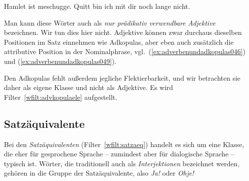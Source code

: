 \begin{exe}
  \ex\label{ex:adverbenundadkopulas045}
  \begin{xlist}
    \ex Hamlet ist meschugge.
    \ex Quitt bin ich mit dir noch lange nicht.
  \end{xlist}
\end{exe}

Man kann diese Wörter auch als \textit{nur prädikativ verwendbare Adjektive} bezeichnen.
Wir tun dies hier nicht.
Adjektive können zwar durchaus dieselben Positionen im Satz einnehmen wie Adkopulas, aber eben auch zusätzlich die attributive Position in der Nominalphrase, vgl.\ (\ref{ex:adverbenundadkopulas046}) und (\ref{ex:adverbenundadkopulas049}).

\begin{exe}
  \ex\label{ex:adverbenundadkopulas046}
  \begin{xlist}
  \end{xlist}
  \ex\label{ex:adverbenundadkopulas049}
  \begin{xlist}
  \end{xlist}
\end{exe}

Den Adkopulas fehlt außerdem jegliche Flektierbarkeit, und wir betrachten sie daher als eigene Klasse und nicht als Adjektive.
Es wird Filter~\ref{wfilt:advkopulaele} aufgestellt.


\subsection{Satzäquivalente}
\label{sec:satzaequivalente}


Bei den \textit{Satzäquivalenten} (Filter~\ref{wfilt:satzaeq}) handelt es sich um eine Klasse, die eher für gesprochene Sprache -- zumindest aber für dialogische Sprache -- typisch ist.
Wörter, die traditionell auch als \textit{Interjektionen} bezeichnet werden, gehören in die Gruppe der Satzäquivalente, also \textit{Ja!} oder \textit{Ohje!}

